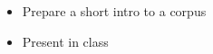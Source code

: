 \documentclass[a4paper,landscape,headrule,footrule,dvips]{foils}
\begin{document}
\begin{CJK}{UTF8}{min}

\begin{itemize}
\item Prepare a short intro to a corpus
\item Present in class
\end{itemize}






\clearpage
\end{CJK}
\end{document}
